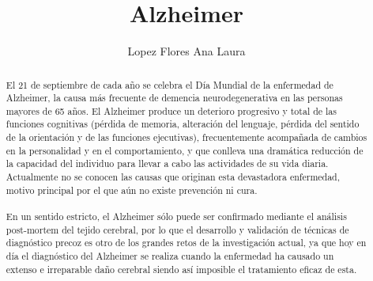 \documentclass[smallextended, 12pt]{article}
\begin{document}
	\title{Alzheimer}
	\author{\large Lopez Flores Ana Laura}
	\maketitle
	
	\begin{abstract}
	El 21 de septiembre de cada a\~no se celebra el D\'ia Mundial de la enfermedad de Alzheimer, la causa m\'as frecuente de demencia neurodegenerativa en las personas mayores de 65 a\~nos. El Alzheimer produce un deterioro progresivo y total de las funciones cognitivas (p\'erdida de memoria, alteraci\'on del lenguaje, p\'erdida del sentido de la orientaci\'on y de las funciones ejecutivas), frecuentemente acompa\~nada de cambios en la personalidad y en el comportamiento, y que conlleva una dram\'atica reducci\'on de la capacidad del individuo para llevar a cabo las actividades de su vida diaria. Actualmente no se conocen las causas que originan esta devastadora enfermedad, motivo principal por el que a\'un no existe prevenci\'on ni cura.
	\\
	\\
	En un sentido estricto, el Alzheimer s\'olo puede ser confirmado mediante el an\'alisis post-mortem del tejido cerebral, por lo que el desarrollo y validaci\'on de t\'ecnicas de diagn\'ostico precoz es otro de los grandes retos de la investigaci\'on actual, ya que hoy en d\'ia el diagn\'ostico del Alzheimer se realiza cuando la enfermedad ha causado un extenso e irreparable da\~no cerebral siendo as\'i imposible el tratamiento eficaz de esta.
	\end{abstract}
	
\end{document}
